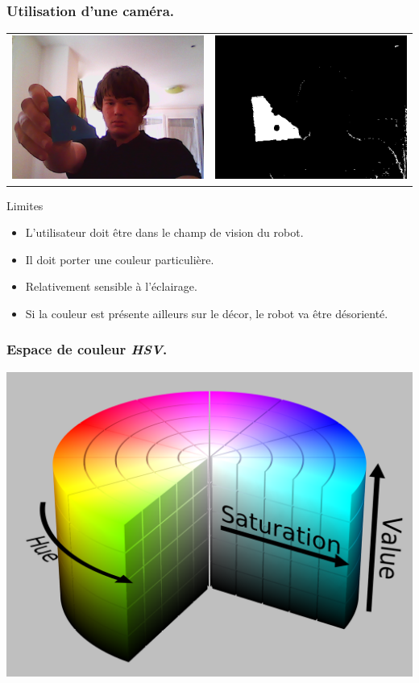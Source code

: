 \begin{frame}
    \frametitle{Utilisation d'une caméra.}
    \begin{tabular}{cc}
        \includegraphics[width=.4\linewidth]{rcs/follow_bef.png} & \includegraphics[width=.4\linewidth]{rcs/follow_aft.png} \\
    \end{tabular}
     { \begin{alertblock}{Limites}
            \begin{itemize}
                \pause \item L'utilisateur doit être dans le champ de vision du robot.
                \pause \item Il doit porter une couleur particulière.
                \pause \item Relativement sensible à l'éclairage.
                \pause \item Si la couleur est présente ailleurs sur le décor, le robot va être désorienté.
            \end{itemize}
    \end{alertblock} }
\end{frame}

\begin{frame}
    \frametitle{Espace de couleur \emph{HSV}.}
    \begin{center}
        \includegraphics[width=.8\linewidth]{rcs/hsv.png}
    \end{center}
\end{frame}

